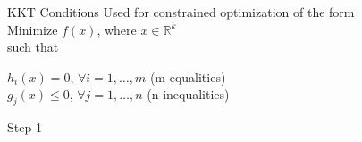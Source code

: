 \documentclass{beamer}
\begin{document}
    
    
    
    
    
    


\begin{frame}{KKT Conditions}
	Used for constrained optimization of the form\\
	\vspace{1cm}
	Minimize $f(x)$, where $x \in \mathbb{R}^k$\\
	such that\\
	\begin{center}
		$h_i(x) = 0$,  $\forall i = 1, \dots, m$ (m equalities)\\
		$g_j(x) \leq 0$,  $\forall j = 1, \dots, n$ (n inequalities)\\
	\end{center}
\end{frame}

\begin{frame}{Step 1}
	\begin{itemize}
	\end{itemize}
\end{frame}
\end{document}
